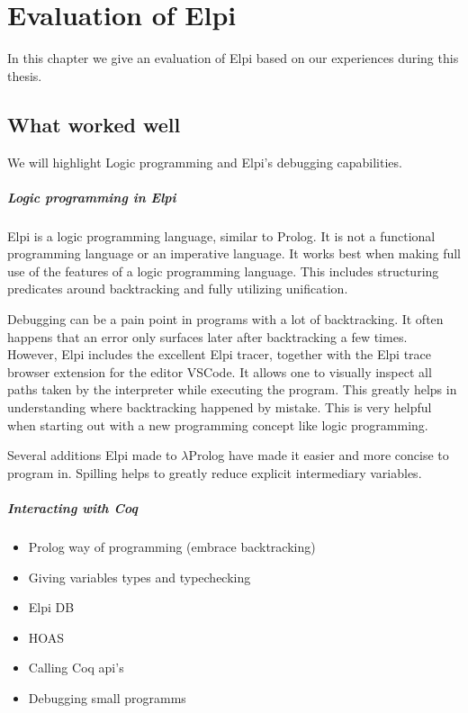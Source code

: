 \documentclass[thesis.tex]{subfiles}
\begin{document}
\VerbatimFootnotes

\chapter{Evaluation of Elpi} \label{ch:evalelpi}
In this chapter we give an evaluation of Elpi based on our experiences during this thesis.

\section{What worked well}
We will highlight Logic programming and Elpi's debugging capabilities.

\paragraph{Logic programming in Elpi}
Elpi is a logic programming language, similar to Prolog. It is not a functional programming language or an imperative language. It works best when making full use of the features of a logic programming language. This includes structuring predicates around backtracking and fully utilizing unification.

Debugging can be a pain point in programs with a lot of backtracking. It often happens that an error only surfaces later after backtracking a few times. However, Elpi includes the excellent Elpi tracer, together with the Elpi trace browser extension \cite{tassiLPCICElpilang2023} for the editor VSCode. It allows one to visually inspect all paths taken by the interpreter while executing the program. This greatly helps in understanding where backtracking happened by mistake. This is very helpful when starting out with a new programming concept like logic programming.

Several additions Elpi made to $\lambda$Prolog have made it easier and more concise to program in. Spilling helps to greatly reduce explicit intermediary variables.

\paragraph{Interacting with Coq}


\begin{itemize}
    \item Prolog way of programming (embrace backtracking)
    \item Giving variables types and typechecking
    \item Elpi DB
    \item HOAS
    \item Calling Coq api's
    \item Debugging small programms
\end{itemize}
\end{document}
